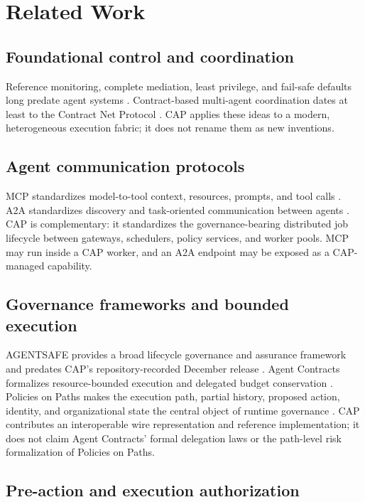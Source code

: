 \section{Related Work}

\subsection{Foundational control and coordination}

Reference monitoring, complete mediation, least privilege, and fail-safe defaults long predate agent systems \citep{anderson1972reference,saltzer1975protection}. Contract-based multi-agent coordination dates at least to the Contract Net Protocol \citep{smith1980contractnet}. CAP applies these ideas to a modern, heterogeneous execution fabric; it does not rename them as new inventions.

\subsection{Agent communication protocols}

MCP standardizes model-to-tool context, resources, prompts, and tool calls \citep{mcp2024}. A2A standardizes discovery and task-oriented communication between agents \citep{a2a2025}. CAP is complementary: it standardizes the governance-bearing distributed job lifecycle between gateways, schedulers, policy services, and worker pools. MCP may run inside a CAP worker, and an A2A endpoint may be exposed as a CAP-managed capability.

\subsection{Governance frameworks and bounded execution}

AGENTSAFE provides a broad lifecycle governance and assurance framework and predates CAP's repository-recorded December release \citep{khan2025agentsafe}. Agent Contracts formalizes resource-bounded execution and delegated budget conservation \citep{ye2026agentcontracts}. Policies on Paths makes the execution path, partial history, proposed action, identity, and organizational state the central object of runtime governance \citep{kaptein2026policies}. CAP contributes an interoperable wire representation and reference implementation; it does not claim Agent Contracts' formal delegation laws or the path-level risk formalization of Policies on Paths.

\subsection{Pre-action and execution authorization}

